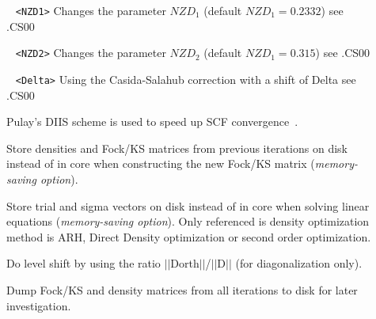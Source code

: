 \begin{description}
\item[] \verb| | \newline
\verb|<NZD1>|\newline
Changes the parameter $NZD_{1}$ (default $NZD_{1} = 0.2332$) see .CS00
\item[] \verb| | \newline
\verb|<NZD2>|\newline
Changes the parameter $NZD_{2}$ (default $NZD_{1} = 0.315$) see .CS00
\item[] \verb| | \newline
\verb|<Delta>|\newline
Using the Casida-Salahub correction with a shift of Delta see .CS00

\item[] Pulay's DIIS scheme is used to speed up SCF convergence~\cite{diis1,diis2}.
\item[] Store densities and Fock/KS matrices from previous 
iterations on disk instead of in core when constructing the new Fock/KS matrix ({\it memory-saving option}).
\item[] Store trial and sigma vectors on disk instead of in core
when solving linear equations ({\it memory-saving option}). Only referenced is density 
optimization method is ARH, Direct Density optimization or second order optimization.
\item[] Do level shift by using the ratio $\vert\vert$Dorth$\vert\vert$/$\vert\vert$D$\vert\vert$ 
(for diagonalization only).
\item[] Dump Fock/KS and density matrices from all iterations to disk for later investigation.

\end{description}
